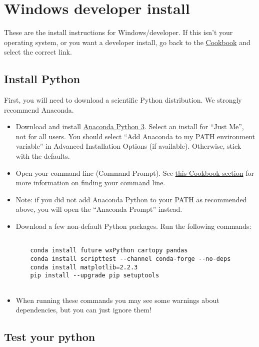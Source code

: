 \documentclass[11pt]{article}
\begin{document}
\tableofcontents


\section{Windows developer install}

These are the install instructions for Windows/developer.  If this isn't your operating system, or you want a developer install, go back to the \href{https://earthref.org/PmagPy/cookbook/#next_steps}{Cookbook} and select the correct link.


\subsection{Install Python}

First, you will need to download a scientific Python distribution.  We strongly recommend Anaconda.

   \begin{itemize}
   \item Download and install \href{https://www.anaconda.com/download}{Anaconda Python 3}.  Select an install for “Just Me”, not for all users.  You should select ``Add Anaconda to my PATH environment variable'' in Advanced Installation Options (if available).  Otherwise, stick with the defaults.
   \item Open your command line (Command Prompt). See \href{https://earthref.org/PmagPy/cookbook/#command_line}{this Cookbook section} for more information on finding your command line.
   \item Note: if you did not add Anaconda Python to your PATH as recommended above, you will open the ``Anaconda Prompt'' instead.
   \item Download a few non-default Python packages.  Run the following commands: \begin{verbatim}

    conda install future wxPython cartopy pandas
    conda install scripttest --channel conda-forge --no-deps
    conda install matplotlib=2.2.3
    pip install --upgrade pip setuptools


\end{verbatim}
   \item When running these commands you may see some warnings about dependencies, but you can just ignore them!

\end{itemize}

\subsection{Test your python}
\end{document}
